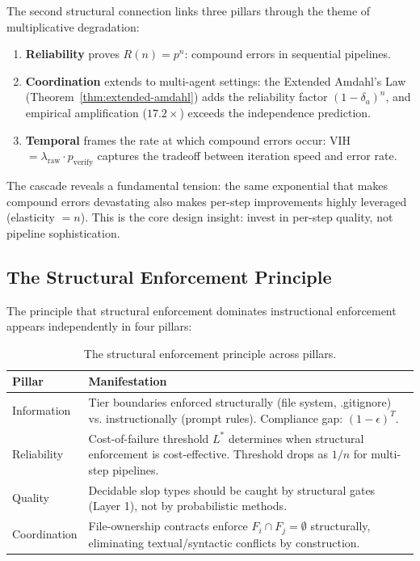 \documentclass[11pt, a4paper]{googledeepmind}
\begin{document}
The second structural connection links three pillars through the theme of multiplicative degradation:

\begin{enumerate}
    \item \textbf{Reliability} proves $R(n) = p^n$: compound errors in sequential pipelines.
    \item \textbf{Coordination} extends to multi-agent settings: the Extended Amdahl's Law (Theorem~\ref{thm:extended-amdahl}) adds the reliability factor $(1-\delta_a)^n$, and empirical amplification ($17.2\times$) exceeds the independence prediction.
    \item \textbf{Temporal} frames the rate at which compound errors occur: VIH $= \lambda_{\text{raw}} \cdot p_{\text{verify}}$ captures the tradeoff between iteration speed and error rate.
\end{enumerate}

The cascade reveals a fundamental tension: the same exponential that makes compound errors devastating also makes per-step improvements highly leveraged (elasticity $= n$). This is the core design insight: invest in per-step quality, not pipeline sophistication.

\subsection{The Structural Enforcement Principle}

The principle that structural enforcement dominates instructional enforcement appears independently in four pillars:

\begin{table}[h]
\centering
\caption{The structural enforcement principle across pillars.}
\label{tab:structural}
\begin{tabular}{lp{10cm}}
\toprule
\textbf{Pillar} & \textbf{Manifestation} \\
\midrule
Information & Tier boundaries enforced structurally (file system, .gitignore) vs. instructionally (prompt rules). Compliance gap: $(1-\epsilon)^T$. \\
Reliability & Cost-of-failure threshold $L^*$ determines when structural enforcement is cost-effective. Threshold drops as $1/n$ for multi-step pipelines. \\
Quality & Decidable slop types should be caught by structural gates (Layer 1), not by probabilistic methods. \\
Coordination & File-ownership contracts enforce $F_i \cap F_j = \emptyset$ structurally, eliminating textual/syntactic conflicts by construction. \\
\bottomrule
\end{tabular}
\end{table}
\end{document}
